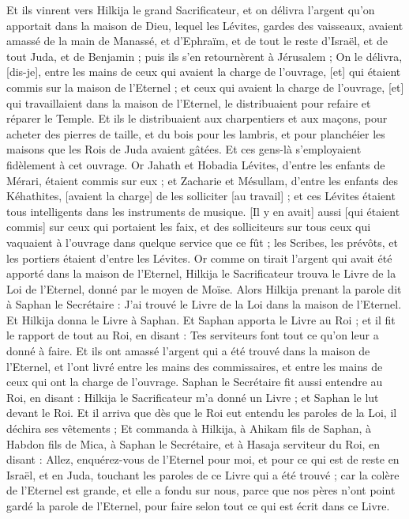 \begin{multicols}{2}
Et ils vinrent vers Hilkija le grand Sacrificateur, et on délivra l'argent qu'on apportait dans la maison de Dieu, lequel les Lévites, gardes des vaisseaux, avaient amassé de la main de Manassé, et d'Ephraïm, et de tout le reste d'Israël, et de tout Juda, et de Benjamin ; puis ils s'en retournèrent à Jérusalem ;
On le délivra, [dis-je], entre les mains de ceux qui avaient la charge de l'ouvrage, [et] qui étaient commis sur la maison de l'Eternel ; et ceux qui avaient la charge de l'ouvrage, [et] qui travaillaient dans la maison de l'Eternel, le distribuaient pour refaire et réparer le Temple.
Et ils le distribuaient aux charpentiers et aux maçons, pour acheter des pierres de taille, et du bois pour les lambris, et pour planchéier les maisons que les Rois de Juda avaient gâtées.
Et ces gens-là s'employaient fidèlement à cet ouvrage. Or Jahath et Hobadia Lévites, d'entre les enfants de Mérari, étaient commis sur eux ; et Zacharie et Mésullam, d'entre les enfants des Kéhathites, [avaient la charge] de les solliciter [au travail] ; et ces Lévites étaient tous intelligents dans les instruments de musique.
[Il y en avait] aussi [qui étaient commis] sur ceux qui portaient les faix, et des solliciteurs sur tous ceux qui vaquaient à l'ouvrage dans quelque service que ce fût ; les Scribes, les prévôts, et les portiers étaient d'entre les Lévites.
Or comme on tirait l'argent qui avait été apporté dans la maison de l'Eternel, Hilkija le Sacrificateur trouva le Livre de la Loi de l'Eternel, donné par le moyen de Moïse.
Alors Hilkija prenant la parole dit à Saphan le Secrétaire : J'ai trouvé le Livre de la Loi dans la maison de l'Eternel. Et Hilkija donna le Livre à Saphan.
Et Saphan apporta le Livre au Roi ; et il fit le rapport de tout au Roi, en disant : Tes serviteurs font tout ce qu'on leur a donné à faire.
Et ils ont amassé l'argent qui a été trouvé dans la maison de l'Eternel, et l'ont livré entre les mains des commissaires, et entre les mains de ceux qui ont la charge de l'ouvrage.
Saphan le Secrétaire fit aussi entendre au Roi, en disant : Hilkija le Sacrificateur m'a donné un Livre ; et Saphan le lut devant le Roi.
Et il arriva que dès que le Roi eut entendu les paroles de la Loi, il déchira ses vêtements ;
Et commanda à Hilkija, à Ahikam fils de Saphan, à Habdon fils de Mica, à Saphan le Secrétaire, et à Hasaja serviteur du Roi, en disant :
Allez, enquérez-vous de l'Eternel pour moi, et pour ce qui est de reste en Israël, et en Juda, touchant les paroles de ce Livre qui a été trouvé ; car la colère de l'Eternel est grande, et elle a fondu sur nous, parce que nos pères n'ont point gardé la parole de l'Eternel, pour faire selon tout ce qui est écrit dans ce Livre.

\end{multicols}
